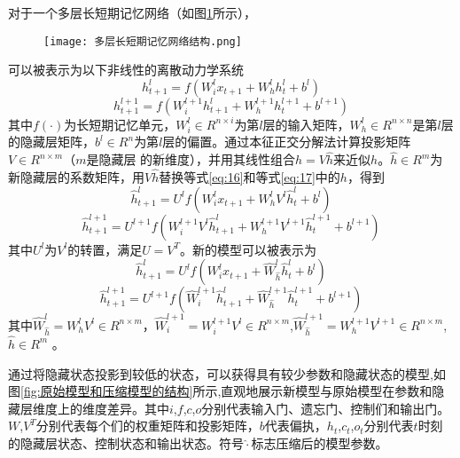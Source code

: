 对于一个多层长短期记忆网络（如图\ref{fig:LSTM}所示），
\begin{figure}[hbp]
  \centering
  \texttt{[image: 多层长短期记忆网络结构.png]}
  \label{fig:LSTM}
\end{figure}
可以被表示为以下非线性的离散动力学系统
\begin{equation}
\label{eq:16}
h_{t + 1}^l = f(W_i^l{x_{t + 1}} + W_h^lh_t^l + {b^l})
\end{equation}
\begin{equation}
\label{eq:17}
h_{t + 1}^{l + 1} = f(W_i^{l + 1}h_{t + 1}^l + W_h^{l + 1}h_t^{l + 1} + {b^{l + 1}})
\end{equation}
其中$f( \cdot )$为长短期记忆单元，$W_i^l \in {R^{n \times i}}$为第$l$层的输入矩阵，$W_h^l \in {R^{n \times n}}$是第$l$层的隐藏层矩阵，${b^l} \in {R^n}$为第$l$层的偏置。通过本征正交分解法计算投影矩阵$V \in {R^{n \times m}}$（$m$是隐藏层 的新维度），并用其线性组合$h = V\hat h$来近似$h$。$\hat h \in {R^m}$为新隐藏层的系数矩阵，用$V\hat h$替换等式\ref{eq:16}和等式\ref{eq:17}中的$h$，得到
\begin{equation}
  \label{eq:18}
  \hat h_{t + 1}^l = {U^l}f(W_i^l{x_{t + 1}} + W_h^l{V^l}\hat h_t^l + {b^l})
  \end{equation}
\begin{equation}
  \label{eq:19}
  \hat h_{t + 1}^{l + 1} = {U^{l + 1}}f(W_i^{l + 1}{V^l}\hat h_{t + 1}^l + W_h^{l + 1}{V^{l + 1}}\hat h_t^{l + 1} + {b^{l + 1}})
  \end{equation}
其中$U^l$为$V^l$的转置，满足$U=V^T$。新的模型可以被表示为
\begin{equation}
  \label{eq:20}
  \hat h_{t + 1}^l = {U^l}f(W_i^l{x_{t + 1}} + \hat W_{\hat h}^l\hat h_t^l + {b^l})
  \end{equation}
\begin{equation}
  \label{eq:21}
  \hat h_{t + 1}^{l + 1} = {U^{l + 1}}f(\hat W_i^{l + 1}\hat h_{t + 1}^l + \hat W_{\hat h}^{l + 1}\hat h_t^{l + 1} + {b^{l + 1}})
  \end{equation}
其中$\hat W_{\hat h}^l = W_h^l{V^l} \in {R^{n \times m}}$，$\hat W_i^{l + 1} = W_i^{l + 1}{V^l} \in {R^{n \times m}}$,$\hat W_{\hat h}^{l + 1} = W_h^{l + 1}{V^{l + 1}} \in {R^{n \times m}}$, $\hat h \in {R^m}$ 。

通过将隐藏状态投影到较低的状态，可以获得具有较少参数和隐藏状态的模型,如图\ref{fig:原始模型和压缩模型的结构}所示,直观地展示新模型与原始模型在参数和隐藏层维度上的维度差异。其中$i$,$f$,$c$,$o$分别代表输入门、遗忘门、控制们和输出门。$W$,$V^T$分别代表每个们的权重矩阵和投影矩阵，$b$代表偏执，$h_t$,$c_t$,$o_t$分别代表$t$时刻的隐藏层状态、控制状态和输出状态。符号$\hat  \cdot $标志压缩后的模型参数。

